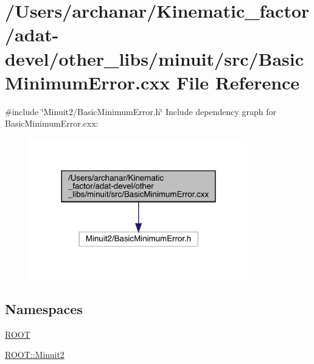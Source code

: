 \hypertarget{adat-devel_2other__libs_2minuit_2src_2BasicMinimumError_8cxx}{}\section{/\+Users/archanar/\+Kinematic\+\_\+factor/adat-\/devel/other\+\_\+libs/minuit/src/\+Basic\+Minimum\+Error.cxx File Reference}
\label{adat-devel_2other__libs_2minuit_2src_2BasicMinimumError_8cxx}
{\ttfamily \#include \char`\"{}Minuit2/\+Basic\+Minimum\+Error.\+h\char`\"{}}\newline
Include dependency graph for Basic\+Minimum\+Error.\+cxx\+:
\nopagebreak
\begin{figure}[H]
\begin{center}
\leavevmode
\includegraphics[width=269pt]{d4/dc8/adat-devel_2other__libs_2minuit_2src_2BasicMinimumError_8cxx__incl}
\end{center}
\end{figure}
\subsection*{Namespaces}
\begin{DoxyCompactItemize}
\item 
 \mbox{\hyperlink{namespaceROOT}{R\+O\+OT}}
\item 
 \mbox{\hyperlink{namespaceROOT_1_1Minuit2}{R\+O\+O\+T\+::\+Minuit2}}
\end{DoxyCompactItemize}
